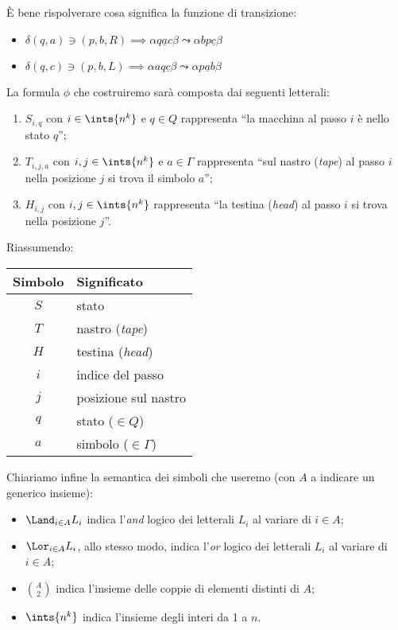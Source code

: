 \`E bene rispolverare cosa significa la funzione di transizione:
\begin{itemize}
	\item $\delta(q,a) \ni (p,b,R) \implies \alpha q \underline{a} c \beta \leadsto \alpha b p \underline{c} \beta$
	\item $\delta(q,c) \ni (p,b,L) \implies \alpha a q \underline{c} \beta \leadsto \alpha p \underline{a} b \beta$
\end{itemize}

La formula $\phi$ che costruiremo sar\`a composta dai seguenti letterali:
\begin{enumerate}
	\item $S_{i,q}$ con $i \in \ints{n^k}$ e $q \in Q$ rappresenta ``la macchina al passo $i$ \`e nello stato $q$'';
	\item $T_{i,j,a}$ con $i,j \in \ints{n^k}$ e $a \in \Gamma$ rappresenta ``sul nastro (\emph{tape}) al passo $i$ nella posizione $j$ si trova il simbolo $a$'';
	\item $H_{i,j}$ con $i,j \in \ints{n^k}$ rappresenta ``la testina (\emph{head}) al passo $i$ si trova nella posizione $j$''.
\end{enumerate}

Riassumendo:
\begin{center}
	\begin{tabular}{c|l}
		Simbolo & Significato \\
		\hline
		$S$ & stato \\
		$T$ & nastro (\emph{tape}) \\
		$H$ & testina (\emph{head}) \\
		$i$ & indice del passo \\
		$j$ & posizione sul nastro \\
		$q$ & stato ($\in Q$) \\
		$a$ & simbolo ($\in \Gamma$)
	\end{tabular}
\end{center}

Chiariamo infine la semantica dei simboli che useremo (con $A$ a indicare un generico insieme):
\begin{itemize}
	\item $\Land_{i \in A} L_i$ indica l'\emph{and} logico dei letterali $L_i$ al variare di $i \in A$;
	\item $\Lor_{i \in A} L_i$, allo stesso modo, indica l'\emph{or} logico dei letterali $L_i$ al variare di $i \in A$;
	\item $\binom{A}{2}$ indica l'insieme delle coppie di elementi distinti di $A$;
	\item $\ints{n^k}$ indica l'insieme degli interi da 1 a $n$.
\end{itemize}

